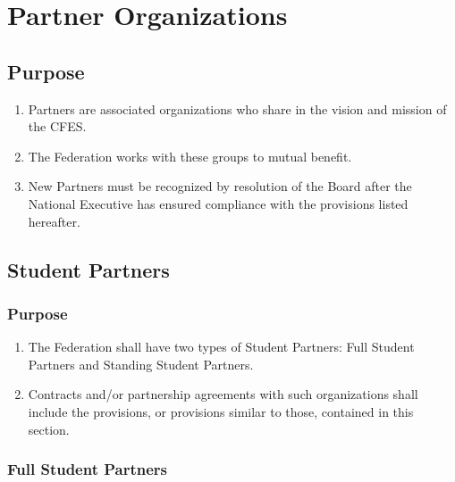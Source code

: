 \section{Partner Organizations}
\label{partner-organizations}

\subsection{Purpose}
\label{purpose-1}

\begin{enumerate}
 \item
  Partners are associated organizations who share in the vision and mission of the CFES.
 \item
  The Federation works with these groups to mutual benefit.
 \item
  New Partners must be recognized by resolution of the Board after the National Executive has ensured compliance with the provisions listed hereafter.
\end{enumerate}

\subsection{Student Partners}
\label{student-partners}

\subsubsection{Purpose}
\label{purpose-2}

\begin{enumerate}
 \item
  The Federation shall have two types of Student Partners: Full Student Partners and Standing Student Partners.
 \item
  Contracts and/or partnership agreements with such organizations shall include the provisions, or provisions similar to those, contained in this section.
\end{enumerate}

\subsubsection{Full Student Partners}
\label{full-student-partners}

